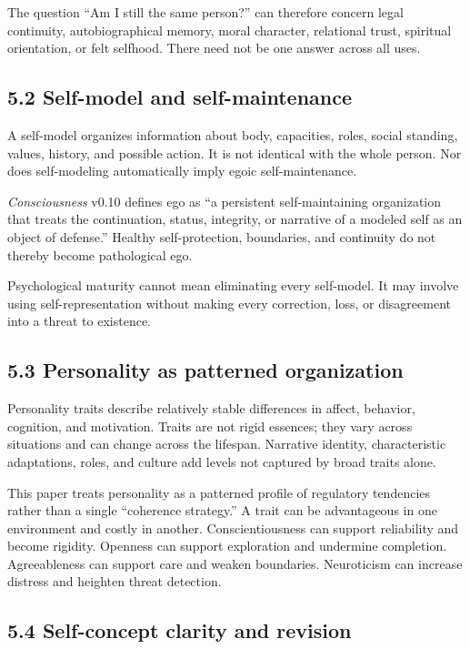 \documentclass[
  11pt,
]{article}
\begin{document}
The question ``Am I still the same person?'' can therefore concern legal
continuity, autobiographical memory, moral character, relational trust,
spiritual orientation, or felt selfhood. There need not be one answer
across all uses.

\subsection{5.2 Self-model and
self-maintenance}\label{self-model-and-self-maintenance}

A self-model organizes information about body, capacities, roles, social
standing, values, history, and possible action. It is not identical with
the whole person. Nor does self-modeling automatically imply egoic
self-maintenance.

\emph{Consciousness} v0.10 defines ego as ``a persistent
self-maintaining organization that treats the continuation, status,
integrity, or narrative of a modeled self as an object of defense.''
Healthy self-protection, boundaries, and continuity do not thereby
become pathological ego.

Psychological maturity cannot mean eliminating every self-model. It may
involve using self-representation without making every correction, loss,
or disagreement into a threat to existence.

\subsection{5.3 Personality as patterned
organization}\label{personality-as-patterned-organization}

Personality traits describe relatively stable differences in affect,
behavior, cognition, and motivation. Traits are not rigid essences; they
vary across situations and can change across the lifespan. Narrative
identity, characteristic adaptations, roles, and culture add levels not
captured by broad traits alone.

This paper treats personality as a patterned profile of regulatory
tendencies rather than a single ``coherence strategy.'' A trait can be
advantageous in one environment and costly in another. Conscientiousness
can support reliability and become rigidity. Openness can support
exploration and undermine completion. Agreeableness can support care and
weaken boundaries. Neuroticism can increase distress and heighten threat
detection.

\subsection{5.4 Self-concept clarity and
revision}\label{self-concept-clarity-and-revision}
\end{document}
